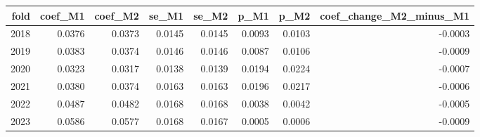 \begin{tabular}{rrrrrrrr}
\toprule
fold & coef\_M1 & coef\_M2 & se\_M1 & se\_M2 & p\_M1 & p\_M2 & coef\_change\_M2\_minus\_M1 \\
\midrule
2018 & 0.0376 & 0.0373 & 0.0145 & 0.0145 & 0.0093 & 0.0103 & -0.0003 \\
2019 & 0.0383 & 0.0374 & 0.0146 & 0.0146 & 0.0087 & 0.0106 & -0.0009 \\
2020 & 0.0323 & 0.0317 & 0.0138 & 0.0139 & 0.0194 & 0.0224 & -0.0007 \\
2021 & 0.0380 & 0.0374 & 0.0163 & 0.0163 & 0.0196 & 0.0217 & -0.0006 \\
2022 & 0.0487 & 0.0482 & 0.0168 & 0.0168 & 0.0038 & 0.0042 & -0.0005 \\
2023 & 0.0586 & 0.0577 & 0.0168 & 0.0167 & 0.0005 & 0.0006 & -0.0009 \\
\bottomrule
\end{tabular}
